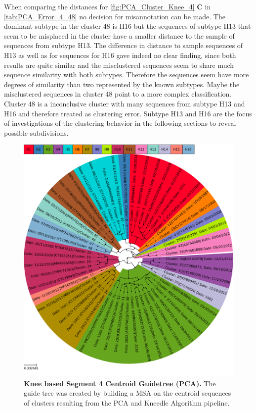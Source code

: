 When comparing the distances for \autoref{fig:PCA_Cluster_Knee_4} \textbf{\textsf{C}} in \autoref{tab:PCA_Error_4_48} no decision for misannotation can be made. The dominant subtype in the cluster 48 is H16 but the sequences of subtype H13 that seem to be misplaced in the cluster have a smaller distance to the sample of sequences from subtype H13. The difference in distance to sample sequences of H13 as well as for sequences for H16 gave indeed no clear finding, since both results are quite similar and the misclustered sequences seem to share much sequence similarity with both subtypes. Therefore the sequences seem have more degrees of similarity than two represented by the known subtypes. Maybe the misclustered sequences in cluster 48 point to a more complex classification. Cluster 48 is a inconclusive cluster with many sequences from subtype H13 and H16 and therefore treated as clustering error. Subtype H13 and H16 are the focus of investigations of the clustering behavior in the following sections to reveal possible subdivisions.

\begin{figure}[!hbt]
    \centering
    \includegraphics[width=\textwidth]{PCA/Guidetree_segment_4_H_Centroid.pdf}
    \caption[Knee based Segment 4 Centroid Guidetree (\Acrshort{PCA})]{\textbf{Knee based Segment 4 Centroid Guidetree (\Acrshort{PCA}).} The guide tree was created by building a \gls{MSA} on the centroid sequences of clusters resulting from the \gls{PCA} and Kneedle Algorithm pipeline. }
    \label{fig:PCA_Guidetree_Centroid_4}
\end{figure}

